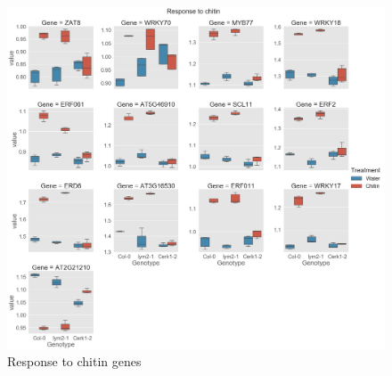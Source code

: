 \documentclass[../main.tex]{subfiles}
\begin{document}
\begin{figure}[ht]
  \centering
  \includegraphics[width=\textwidth, height=\textheight, keepaspectratio]{figures/response to chitin.png}
  \caption{\label{fig:respchitin} Response to chitin genes}
\end{figure}
\end{document}
